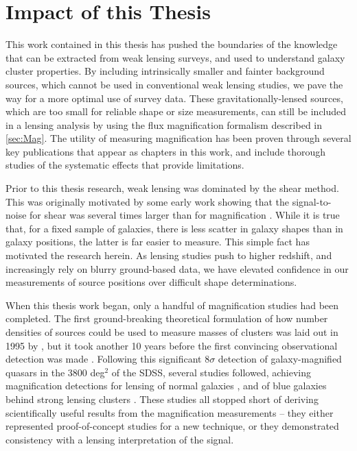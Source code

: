 \section{Impact of this Thesis}
\label{sec:Impact}

This work contained in this thesis has pushed the boundaries of the knowledge that can be extracted from weak lensing surveys, and used to understand galaxy cluster properties. By including intrinsically smaller and fainter background sources, which cannot be used in conventional weak lensing studies, we pave the way for a more optimal use of survey data. These gravitationally-lensed sources, which are too small for reliable shape or size measurements, can still be included in a lensing analysis by using the flux magnification formalism described in \autoref{sec:Mag}. The utility of measuring magnification has been proven through several key publications that appear as chapters in this work, and include thorough studies of the systematic effects that provide limitations. 

Prior to this thesis research, weak lensing was dominated by the shear method. This was originally motivated by some early work showing that the signal-to-noise for shear was several times larger than for magnification \citep{Schneider00}. While it is true that, for a fixed sample of galaxies, there is less scatter in galaxy shapes than in galaxy positions, the latter is far easier to measure. This simple fact has motivated the research herein. As lensing studies push to higher redshift, and increasingly rely on blurry ground-based data, we have elevated confidence in our measurements of source positions over difficult shape determinations. 

When this thesis work began, only a handful of magnification studies had been completed. The first ground-breaking theoretical formulation of how number densities of sources could be used to measure masses of clusters was laid out in 1995 by \citet{Broadhurst95}, but it took another 10 years before the first convincing observational detection was made \citep{Scranton05}. Following this significant $8\sigma$ detection of galaxy-magnified quasars in the 3800 deg$^2$ of the \ac{SDSS}, several studies followed, achieving magnification detections for lensing of normal galaxies \citep{Hildebrandt09b}, and of blue galaxies behind strong lensing clusters \citep{Umetsu11}. These studies all stopped short of deriving scientifically useful results from the magnification measurements -- they either represented proof-of-concept studies for a new technique, or they demonstrated consistency with a lensing interpretation of the signal.

